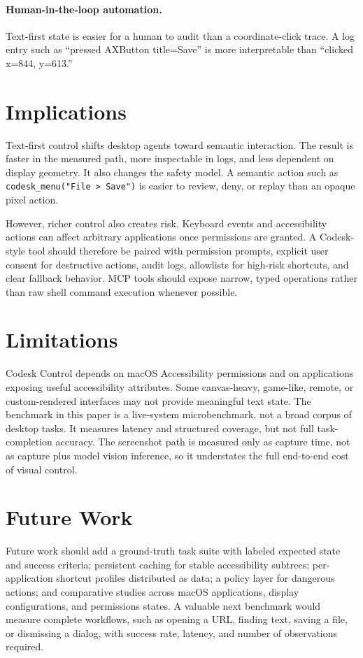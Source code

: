 \documentclass[11pt]{article}
\begin{document}
\paragraph{Human-in-the-loop automation.}
Text-first state is easier for a human to audit than a coordinate-click trace. A log entry such as ``pressed AXButton title=Save'' is more interpretable than ``clicked x=844, y=613.''

\section{Implications}

Text-first control shifts desktop agents toward semantic interaction. The result is faster in the measured path, more inspectable in logs, and less dependent on display geometry. It also changes the safety model. A semantic action such as \texttt{codesk\_menu("File > Save")} is easier to review, deny, or replay than an opaque pixel action.

However, richer control also creates risk. Keyboard events and accessibility actions can affect arbitrary applications once permissions are granted. A Codesk-style tool should therefore be paired with permission prompts, explicit user consent for destructive actions, audit logs, allowlists for high-risk shortcuts, and clear fallback behavior. MCP tools should expose narrow, typed operations rather than raw shell command execution whenever possible.

\section{Limitations}

Codesk Control depends on macOS Accessibility permissions and on applications exposing useful accessibility attributes. Some canvas-heavy, game-like, remote, or custom-rendered interfaces may not provide meaningful text state. The benchmark in this paper is a live-system microbenchmark, not a broad corpus of desktop tasks. It measures latency and structured coverage, but not full task-completion accuracy. The screenshot path is measured only as capture time, not as capture plus model vision inference, so it understates the full end-to-end cost of visual control.

\section{Future Work}

Future work should add a ground-truth task suite with labeled expected state and success criteria; persistent caching for stable accessibility subtrees; per-application shortcut profiles distributed as data; a policy layer for dangerous actions; and comparative studies across macOS applications, display configurations, and permissions states. A valuable next benchmark would measure complete workflows, such as opening a URL, finding text, saving a file, or dismissing a dialog, with success rate, latency, and number of observations required.
\end{document}

